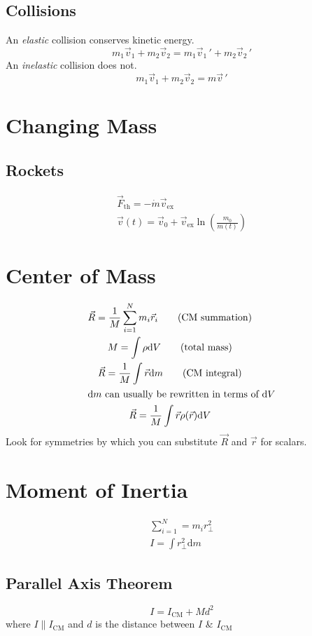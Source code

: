 \documentclass[tbtags]{cheatsheet}
\begin{document}
		\subsection{Collisions}
			An \emph{elastic} collision conserves kinetic energy.
			\[
				m_1\vec v_1 + m_2\vec v_2 = m_1\vec v_1\,' + m_2\vec v_2\,'
			\]
			An \emph{inelastic} collision does not.
			\[
				m_1\vec v_1 + m_2\vec v_2 = m\vec v\,'
			\]
	\section{Changing Mass}
		\subsection{Rockets}
			\begin{gather*}
				\vec F_\mathrm{th} = -\dot{m}\vec v_\mathrm{ex}		\tag{thrust}\\
				\vec v(t) = \vec v_0 + \vec v_\mathrm{ex}\ln\left( \frac{m_0}{m(t)} \right)	\tag{$\Delta V$}
			\end{gather*}
	\section{Center of Mass}
	\begin{gather*}
		\vec R = \frac{1}{M}\sum_{i=1}^N m_i \vec r_i	\tag{CM summation}\raisetag{-10pt}\\
		M = \int \rho \mathrm{d}V	\tag{total mass}\\
		\vec R =  \frac{1}{M}  \int \vec r \mathrm{d}m \tag{CM integral}\raisetag{-6pt}\\
	\intertext{$\mathrm{d}m$ can usually be rewritten in terms of $\mathrm{d}V$}
		\vec R = \frac{1}{M} \int \vec r \rho(\vec r) \mathrm{d}V
	\end{gather*}
	Look for symmetries by which you can substitute $\vec R$ and $\vec r$ for scalars.

	\section{Moment of Inertia}
	\begin{gather*}
		\sum_{i=1}^{N} = m_i r^2_\perp \tag{summation}\\
		I = \int r^2_\perp \mathrm{d}m	\tag{integral}
	\end{gather*}
		\subsection{Parallel Axis Theorem}
			\[ I = I_\mathrm{CM} + Md^2 \]
			where $I \parallel I_\mathrm{CM}$ and $d$ is the distance between $I$ \& $I_\mathrm{CM}$
\end{document}
